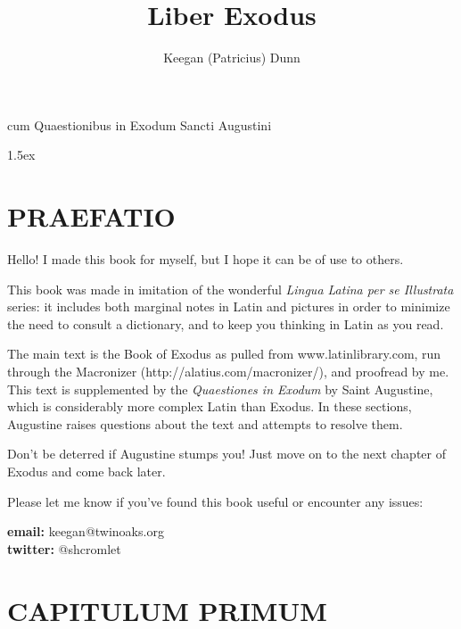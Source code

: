 \documentclass[20pt, twoside]{extbook}
\begin{document}
\title{Liber Exodus}
\author{Keegan (Patricius) Dunn}

\begin{titlepage}
{\textsf{cum Quaestionibus in Exodum Sancti Augustini}}
\end{titlepage}
\parskip 1.5ex

\pagecolor{maincolor}
\mainmatter
{}

\chapter{PRAEFATIO}

Hello! I made this book for myself, but I hope it can be of use to others.

This book was made in imitation of the wonderful {\it Lingua Latina per se
Illustrata} series: it includes both marginal notes in Latin and pictures in
order to minimize the need to consult a dictionary, and to keep you thinking in
Latin as you read.

The main text is the Book of Exodus as pulled from www.latinlibrary.com,
run through the Macronizer (http://alatius.com/macronizer/), and proof\-read
by me.  This text is supplemented by the {\it Quaestiones in Exodum} by
Saint Augustine, which is considerably more complex Latin than Exodus. In
these sections, Augustine raises questions about the text and attempts to  
resolve them. 

Don't be deterred if Augustine stumps you!
Just move on to the next chapter of Exodus and come back later.  

Please let me know if you've found this book useful or encounter any
issues:

\noindent
{\bf email:} keegan@twinoaks.org\\{\bf twitter:} @shcromlet

\chapter{CAPITULUM PRIMUM}

\end{document}
